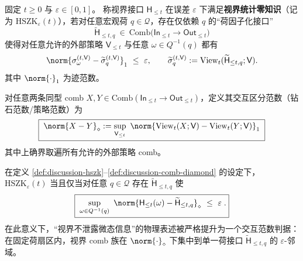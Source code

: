 \begin{definition}\label{def:discussion-hszk}
固定 \(t\ge 0\) 与 \(\varepsilon\in[0,1]\)。
称视界接口 \(\mathsf{H}_{\le t}\) 在误差 \(\varepsilon\) 下满足\textbf{视界统计零知识}（记为 \(\mathrm{HSZK}_\varepsilon(t)\)），若对任意宏观荷 \(q\in\mathcal{Q}\)，存在仅依赖 \(q\) 的“荷因子化接口”
\[
\widetilde{\mathsf{H}}_{\le t,q}\ \in\ \mathrm{Comb}\bigl(\mathsf{In}_{\le t}\to \mathsf{Out}_{\le t}\bigr)
\]
使得对任意允许的外部策略 \(\mathsf{V}_{\le t}\) 与任意 \(\omega\in Q^{-1}(q)\) 都有
\begin{equation}\label{eq:discussion-hszk-view-trace}
\norm{\sigma^{(t,\mathsf{V})}_\omega-\widetilde{\sigma}^{(t,\mathsf{V})}_q}_1\ \le\ \varepsilon,
\qquad
\widetilde{\sigma}^{(t,\mathsf{V})}_q:=\mathrm{View}_t(\widetilde{\mathsf{H}}_{\le t,q};\mathsf{V}).
\end{equation}
其中 \(\norm{\cdot}_1\) 为迹范数。
\end{definition}

\begin{definition}\label{def:discussion-comb-diamond}
对任意两条同型 comb \(X,Y\in \mathrm{Comb}(\mathsf{In}_{\le t}\to\mathsf{Out}_{\le t})\)，定义其交互区分范数（钻石范数/策略范数）为
\begin{equation}\label{eq:discussion-comb-diamond-def}
\boxed{\;
\norm{X-Y}_\diamond
:=\sup_{\mathsf{V}_{\le t}}\ \norm{\mathrm{View}_t(X;\mathsf{V})-\mathrm{View}_t(Y;\mathsf{V})}_1\;}
\end{equation}
其中上确界取遍所有允许的外部策略 comb。
\end{definition}

\begin{theorem}\label{thm:discussion-hszk-iff-diamond}
在定义 \ref{def:discussion-hszk}--\ref{def:discussion-comb-diamond} 的设定下，
\(\mathrm{HSZK}_\varepsilon(t)\)
当且仅当对任意 \(q\in\mathcal{Q}\) 存在 \(\widetilde{\mathsf{H}}_{\le t,q}\) 使
\begin{equation}\label{eq:discussion-hszk-diamond}
\boxed{\;
\sup_{\omega\in Q^{-1}(q)}\ \norm{\mathsf{H}_{\le t}(\omega)-\widetilde{\mathsf{H}}_{\le t,q}}_\diamond\ \le\ \varepsilon\;.}
\end{equation}
在此意义下，“视界不泄露微态信息”的物理表述被严格提升为一个交互范数判据：在固定荷扇区内，视界 comb 族在 \(\norm{\cdot}_\diamond\) 下集中到单一荷接口 \(\widetilde{\mathsf{H}}_{\le t,q}\) 的 \(\varepsilon\)-邻域。
\end{theorem}

